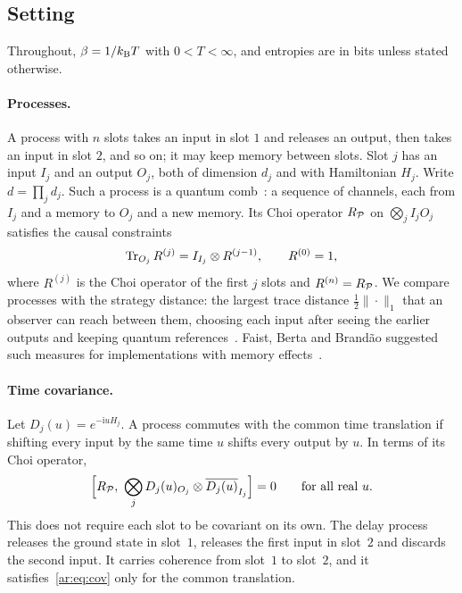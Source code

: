\subsection{Setting}\label{ar:sec:setting}

Throughout, $\beta=1/k_{\mathrm B} T$ with $0<T<\infty$, and entropies are in bits unless stated otherwise.

\paragraph{Processes.} A process with $n$ slots takes an input in slot $1$ and releases an output, then takes an input in slot $2$, and so on; it may keep memory between slots. Slot $j$ has an input $I_j$ and an output $O_j$, both of dimension $d_j$ and with Hamiltonian $H_j$. Write $d=\prod_jd_j$. Such a process is a quantum comb~\cite{Chiribella08,CDP09,GutoskiWatrous07}: a sequence of channels, each from $I_j$ and a memory to $O_j$ and a new memory. Its Choi operator $R_\mathcal P$ on $\bigotimes_jI_jO_j$ satisfies the causal constraints
\begin{equation}\label{ar:eq:causal}
\operatorname{Tr}_{O_j}R^{(j)}=I_{I_j}\otimes R^{(j-1)},\qquad R^{(0)}=1,
\end{equation}
where $R^{(j)}$ is the Choi operator of the first $j$ slots and $R^{(n)}=R_\mathcal P$. We compare processes with the strategy distance: the largest trace distance $\frac12\|\cdot\|_1$ that an observer can reach between them, choosing each input after seeing the earlier outputs and keeping quantum references~\cite{Chiribella08,GutoskiWatrous07}. Faist, Berta and Brand\~ao suggested such measures for implementations with memory effects~\cite{FBB19}.

\paragraph{Time covariance.} Let $D_j(u)=e^{-\mathrm iuH_j}$. A process commutes with the common time translation if shifting every input by the same time $u$ shifts every output by $u$. In terms of its Choi operator,
\begin{equation}\label{ar:eq:cov}
\Bigl[R_\mathcal P,\ \bigotimes_j D_j(u)_{O_j}\otimes\overline{D_j(u)}_{I_j}\Bigr]=0\qquad\text{for all real }u.
\end{equation}
This does not require each slot to be covariant on its own. The delay process releases the ground state in slot~$1$, releases the first input in slot~$2$ and discards the second input. It carries coherence from slot~$1$ to slot~$2$, and it satisfies~\eqref{ar:eq:cov} only for the common translation.

